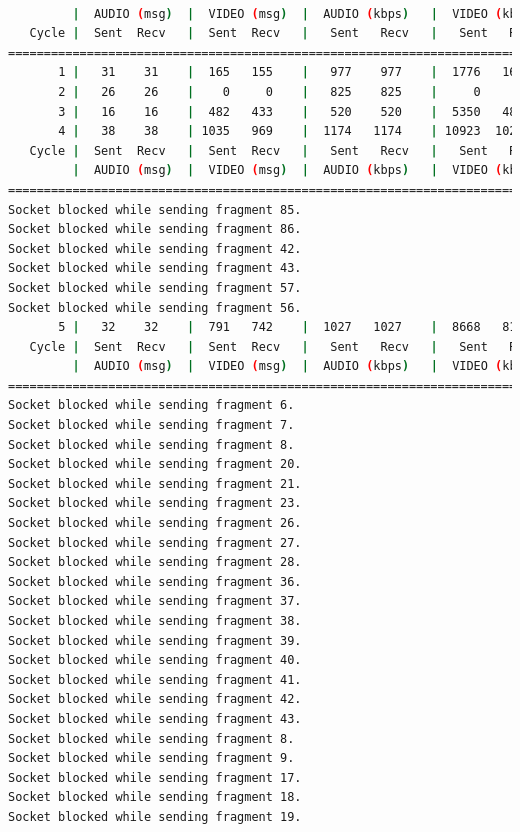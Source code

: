 \begin{lstlisting}[language=bash,basicstyle=\ttfamily\tiny]

         |  AUDIO (msg)  |  VIDEO (msg)  |  AUDIO (kbps)   |  VIDEO (kbps)   |     CPU (%) 
   Cycle |  Sent  Recv   |  Sent  Recv   |   Sent   Recv   |   Sent   Recv   | Program System
================================================================================================
       1 |   31    31    |  165   155    |   977    977    |  1776   1670    |  20      0       
       2 |   26    26    |    0     0    |   825    825    |     0      0    |  41     71       
       3 |   16    16    |  482   433    |   520    520    |  5350   4803    |  28     82       
       4 |   38    38    | 1035   969    |  1174   1174    | 10923  10228    |  23     70       
   Cycle |  Sent  Recv   |  Sent  Recv   |   Sent   Recv   |   Sent   Recv   | Program System
         |  AUDIO (msg)  |  VIDEO (msg)  |  AUDIO (kbps)   |  VIDEO (kbps)   |     CPU (%) 
===========================================================================================
Socket blocked while sending fragment 85.
Socket blocked while sending fragment 86.
Socket blocked while sending fragment 42.
Socket blocked while sending fragment 43.
Socket blocked while sending fragment 57.
Socket blocked while sending fragment 56.
       5 |   32    32    |  791   742    |  1027   1027    |  8668   8130    |  37     74       
   Cycle |  Sent  Recv   |  Sent  Recv   |   Sent   Recv   |   Sent   Recv   | Program System
         |  AUDIO (msg)  |  VIDEO (msg)  |  AUDIO (kbps)   |  VIDEO (kbps)   |     CPU (%) 
===========================================================================================
Socket blocked while sending fragment 6.
Socket blocked while sending fragment 7.
Socket blocked while sending fragment 8.
Socket blocked while sending fragment 20.
Socket blocked while sending fragment 21.
Socket blocked while sending fragment 23.
Socket blocked while sending fragment 26.
Socket blocked while sending fragment 27.
Socket blocked while sending fragment 28.
Socket blocked while sending fragment 36.
Socket blocked while sending fragment 37.
Socket blocked while sending fragment 38.
Socket blocked while sending fragment 39.
Socket blocked while sending fragment 40.
Socket blocked while sending fragment 41.
Socket blocked while sending fragment 42.
Socket blocked while sending fragment 43.
Socket blocked while sending fragment 8.
Socket blocked while sending fragment 9.
Socket blocked while sending fragment 17.
Socket blocked while sending fragment 18.
Socket blocked while sending fragment 19.

\end{lstlisting}
